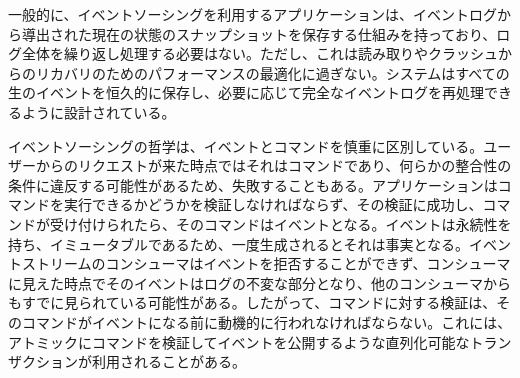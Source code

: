 \documentclass[../../../main]{subfiles}
\begin{document}
    一般的に、イベントソーシングを利用するアプリケーションは、イベントログから導出された現在の状態のスナップショットを保存する仕組みを持っており、ログ全体を繰り返し処理する必要はない。ただし、これは読み取りやクラッシュからのリカバリのためのパフォーマンスの最適化に過ぎない。システムはすべての生のイベントを恒久的に保存し、必要に応じて完全なイベントログを再処理できるように設計されている。

    イベントソーシングの哲学は、イベントとコマンドを慎重に区別している。ユーザーからのリクエストが来た時点ではそれはコマンドであり、何らかの整合性の条件に違反する可能性があるため、失敗することもある。アプリケーションはコマンドを実行できるかどうかを検証しなければならず、その検証に成功し、コマンドが受け付けられたら、そのコマンドはイベントとなる。イベントは永続性を持ち、イミュータブルであるため、一度生成されるとそれは事実となる。イベントストリームのコンシューマはイベントを拒否することができず、コンシューマに見えた時点でそのイベントはログの不変な部分となり、他のコンシューマからもすでに見られている可能性がある。したがって、コマンドに対する検証は、そのコマンドがイベントになる前に動機的に行われなければならない。これには、アトミックにコマンドを検証してイベントを公開するような直列化可能なトランザクションが利用されることがある。\cite{DB指向イベントソーシング}
\end{document}
